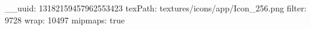 __uuid: 13182159457962553423
texPath: textures/icons/app/Icon_256.png
filter: 9728
wrap: 10497
mipmaps: true
